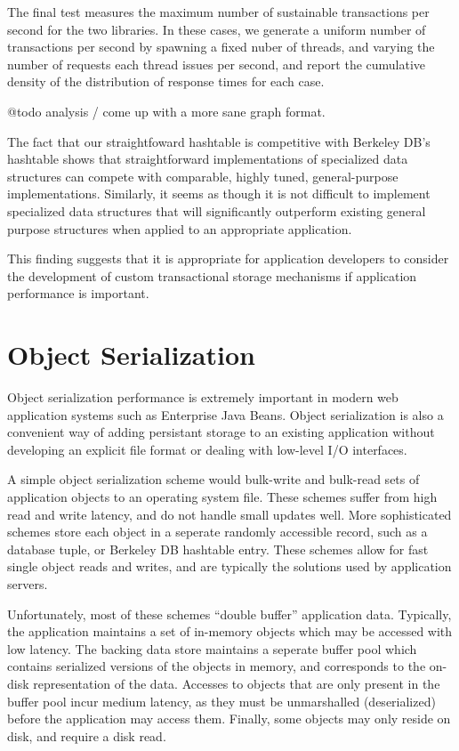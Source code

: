 \documentclass[letterpaper,twocolumn,english]{article}
\begin{document}
The final test measures the maximum number of sustainable transactions
per second for the two libraries.  In these cases, we generate a
uniform number of transactions per second by spawning a fixed nuber of
threads, and varying the number of requests each thread issues per
second, and report the cumulative density of the distribution of
response times for each case.

@todo analysis / come up with a more sane graph format.

The fact that our straightfoward hashtable is competitive with Berkeley DB's hashtable shows that
straightforward implementations of specialized data structures can 
compete with comparable, highly tuned, general-purpose implementations.  
Similarly, it seems as though it is not difficult to implement specialized 
data structures that will significantly outperform existing 
general purpose structures when applied to an appropriate application.

This finding suggests that it is appropriate for
application developers to consider the development of custom
transactional storage mechanisms if application performance is
important.

\section{Object Serialization}
\label{OASYS}

Object serialization performance is extremely important in modern web
application systems such as Enterprise Java Beans.  Object
serialization is also a convenient way of adding persistant storage to
an existing application without developing an explicit file format or
dealing with low-level I/O interfaces.

A simple object serialization scheme would bulk-write and bulk-read
sets of application objects to an operating system file.  These
schemes suffer from high read and write latency, and do not handle
small updates well.  More sophisticated schemes store each object in a
seperate randomly accessible record, such as a database tuple, or
Berkeley DB hashtable entry.  These schemes allow for fast single
object reads and writes, and are typically the solutions used by
application servers.

Unfortunately, most of these schemes ``double buffer'' application
data.  Typically, the application maintains a set of in-memory objects
which may be accessed with low latency.  The backing data store
maintains a seperate buffer pool which contains serialized versions of
the objects in memory, and corresponds to the on-disk representation
of the data.  Accesses to objects that are only present in the buffer
pool incur medium latency, as they must be unmarshalled (deserialized)
before the application may access them.  Finally, some objects may
only reside on disk, and require a disk read.
\end{document}
